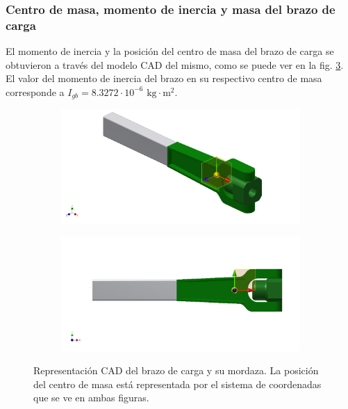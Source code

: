 \subsubsection{Centro de masa, momento de inercia y masa del brazo de carga}
El momento de inercia y la posición del centro de masa del brazo de carga se obtuvieron a través del modelo CAD del mismo, como se puede ver en la fig. \ref{fig:brazocarga_inventor}. El valor del momento de inercia del brazo en su respectivo centro de masa corresponde a $I_{gb} = 8.3272\cdot 10^{-6} \text{ kg}\cdot \text{m}^2$.

\begin{figure}[h]
\centering
	\begin{subfigure}{0.5\linewidth}
		\centering
		\includegraphics[width=1\linewidth, trim={4cm 0cm 1cm 0cm},clip]{Imagenes/brazocarga_iso.pdf}
		\caption{}\label{fig:bc_iso}
	\end{subfigure}%
	\begin{subfigure}{0.5\linewidth}
		\centering
		\includegraphics[width=1\linewidth, trim={4cm 0cm 1cm 1cm},clip]{Imagenes/brazocarga_lat.pdf}
		\caption{}\label{fig:bc_lateral}
	\end{subfigure}%
\caption{Representación CAD del brazo de carga y su mordaza. La posición del centro de masa está representada por el sistema de coordenadas que se ve en ambas figuras.}
\label{fig:brazocarga_inventor}
\end{figure}

